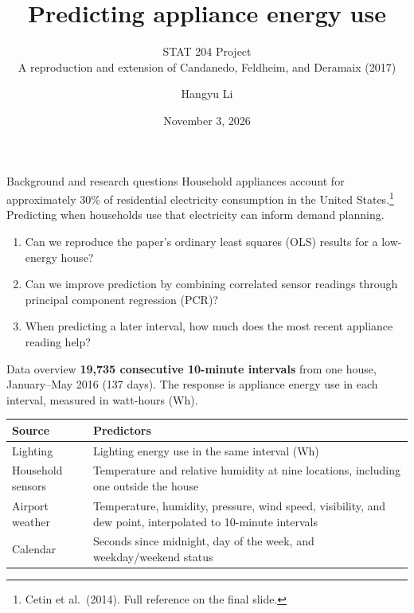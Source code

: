 \documentclass[aspectratio=169,11pt]{beamer}
\title[STAT 204 Project]{Predicting appliance energy use}
\subtitle{STAT 204 Project\\[0.5em]\small A reproduction and extension of Candanedo, Feldheim, and Deramaix (2017)}
\author{Hangyu Li}
\institute{Department of Statistics\\University of California, Santa Cruz}
\date{November 3, 2026}
\begin{document}
\begin{frame}
\titlepage
\end{frame}

\begin{frame}{Background and research questions}
Household appliances account for approximately 30\% of residential electricity consumption in the United States.\footnote{\scriptsize Cetin et al.\ (2014). Full reference on the final slide.} Predicting when households use that electricity can inform demand planning.
\medskip
\begin{enumerate}
\item Can we reproduce the paper's ordinary least squares (OLS) results for a low-energy house?
\item Can we improve prediction by combining correlated sensor readings through principal component regression (PCR)?
\item When predicting a later interval, how much does the most recent appliance reading help?
\end{enumerate}
\end{frame}

\begin{frame}{Data overview}
\textbf{19,735 consecutive 10-minute intervals} from one house, January--May 2016 (137 days). The response is appliance energy use in each interval, measured in watt-hours (Wh).
\medskip

\begin{tabular}{@{}lp{.70\linewidth}@{}}
\toprule
Source & Predictors\\\midrule
Lighting & Lighting energy use in the same interval (Wh)\\[.4em]
Household sensors & Temperature and relative humidity at nine locations, including one outside the house\\[.4em]
Airport weather & Temperature, humidity, pressure, wind speed, visibility, and dew point, interpolated to 10-minute intervals\\[.4em]
Calendar & Seconds since midnight, day of the week, and weekday/weekend status\\
\bottomrule
\end{tabular}
\end{frame}
\end{document}

